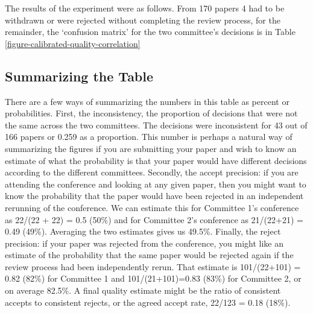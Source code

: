The results of the experiment were as follows. From 170 papers 4 had to
be withdrawn or were rejected without completing the review process, for
the remainder, the `confusion matrix' for the two committee's decisions
is in Table \ref{figure-calibrated-quality-correlation}


\hypertarget{summarizing-the-table}{%
\subsection{Summarizing the Table}\label{summarizing-the-table}}

There are a few ways of summarizing the numbers in this table as percent
or probabilities. First, the inconsistency, the proportion of decisions
that were not the same across the two committees. The decisions were
inconsistent for 43 out of 166 papers or 0.259 as a proportion. This
number is perhaps a natural way of summarizing the figures if you are
submitting your paper and wish to know an estimate of what the
probability is that your paper would have different decisions according
to the different committees. Secondly, the accept precision: if you are
attending the conference and looking at any given paper, then you might
want to know the probability that the paper would have been rejected in
an independent rerunning of the conference. We can estimate this for
Committee 1's conference as 22/(22 + 22) = 0.5 (50\%) and for Committee
2's conference as 21/(22+21) = 0.49 (49\%). Averaging the two estimates
gives us 49.5\%. Finally, the reject precision: if your paper was
rejected from the conference, you might like an estimate of the
probability that the same paper would be rejected again if the review
process had been independently rerun. That estimate is 101/(22+101) =
0.82 (82\%) for Committee 1 and 101/(21+101)=0.83 (83\%) for Committee
2, or on average 82.5\%. A final quality estimate might be the ratio of
consistent accepts to consistent rejects, or the agreed accept rate,
22/123 = 0.18 (18\%).

